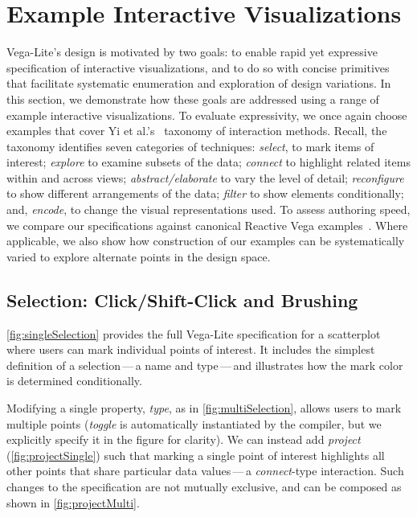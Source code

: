 \section{Example Interactive Visualizations}
\label{sec:vl:examples}

Vega-Lite's design is motivated by two goals: to enable rapid yet expressive
specification of interactive visualizations, and to do so with concise
primitives that facilitate systematic enumeration and exploration of design
variations. In this section, we demonstrate how these goals are addressed using
a range of example interactive visualizations. To evaluate expressivity, we once
again choose examples that cover Yi et al.'s~\cite{yi:understanding} taxonomy of
interaction methods. Recall, the taxonomy identifies seven categories of
techniques: \emph{select}, to mark items of interest; \emph{explore} to examine
subsets of the data; \emph{connect} to highlight related items within and across
views; \emph{abstract/elaborate} to vary the level of detail; \emph{reconfigure}
to show different arrangements of the data; \emph{filter} to show elements
conditionally; and, \emph{encode}, to change the visual representations used. To
assess authoring speed, we compare our specifications against canonical Reactive
Vega examples~\cite{reactive-vega-arch, reactive-vega-model, vega:editor}. Where
applicable, we also show how construction of our examples can be systematically
varied to explore alternate points in the design space.

\subsection{Selection: Click/Shift-Click and Brushing}

\cref{fig:singleSelection} provides the full Vega-Lite specification for a
scatterplot where users can mark individual points of interest. It includes the
simplest definition of a selection\,---\,a name and type\,---\,and illustrates
how the mark color is determined conditionally.

Modifying a single property, \emph{type}, as in \cref{fig:multiSelection},
allows users to mark multiple points (\emph{toggle} is automatically
instantiated by the compiler, but we explicitly specify it in the figure for
clarity). We can instead add \emph{project} (\cref{fig:projectSingle})
such that marking a single point of interest highlights all other points that
share particular data values\,---\,a \emph{connect}-type interaction. Such
changes to the specification are not mutually exclusive, and can be composed as
shown in \cref{fig:projectMulti}.

